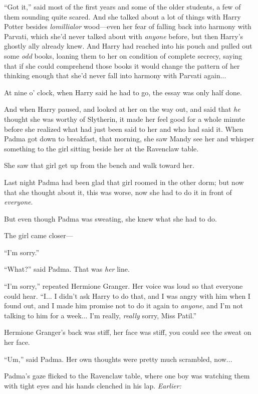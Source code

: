 “Got it,” said most of the first years and some of the older students, a few of them sounding quite scared.
\sbreak
And she talked about a lot of things with Harry Potter besides \emph{lomillialor} wood—even her fear of falling back into harmony with Parvati, which she’d never talked about with \emph{anyone} before, but then Harry’s ghostly ally already knew. And Harry had reached into his pouch and pulled out some \emph{odd} books, loaning them to her on condition of complete secrecy, saying that if she could comprehend those books it would change the pattern of her thinking enough that she’d never fall into harmony with Parvati again...

At nine o’ clock, when Harry said he had to go, the essay was only half done.

And when Harry paused, and looked at her on the way out, and said that \emph{he} thought she was worthy of Slytherin, it made her feel good for a whole minute before she realized what had just been said to her and who had said it.
\sbreak
When Padma got down to breakfast, that morning, she saw Mandy see her and whisper something to the girl sitting beside her at the Ravenclaw table.

She saw that girl get up from the bench and walk toward her.

Last night Padma had been glad that girl roomed in the other dorm; but now that she thought about it, this was worse, now she had to do it in front of \emph{everyone}.

But even though Padma was sweating, she knew what she had to do.

The girl came closer—

“I’m sorry.”

“What?” said Padma. That was \emph{her} line.

“I’m sorry,” repeated Hermione Granger. Her voice was loud so that everyone could hear. “I... I didn’t ask Harry to do that, and I was angry with him when I found out, and I made him promise not to do it again to \emph{anyone}, and I’m not talking to him for a week... I’m really, \emph{really} sorry, Miss Patil.”

Hermione Granger’s back was stiff, her face was stiff, you could see the sweat on her face.

“Um,” said Padma. Her own thoughts were pretty much scrambled, now...

Padma’s gaze flicked to the Ravenclaw table, where one boy was watching them with tight eyes and his hands clenched in his lap.
\sbreak
\emph{Earlier:}

